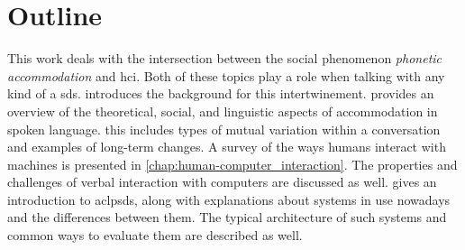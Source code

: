 \section*{Outline}
%
This work deals with the intersection between the social phenomenon \emph{phonetic accommodation} and \acl{hci}.
Both of these topics play a role when talking with any kind of a \acl{sds}.
 introduces the background for this intertwinement.
 provides an overview of the theoretical, social, and linguistic aspects of accommodation in spoken language.
this includes types of mutual variation within a conversation and examples of long-term changes.
A survey of the ways humans interact with machines is presented in \cref{chap:human-computer_interaction}.
The properties and challenges of verbal interaction with computers are discussed as well.
 gives an introduction to aclp{sds}, along with explanations about systems in use nowadays and the differences between them.
The typical architecture of such systems and common ways to evaluate them are described as well.

